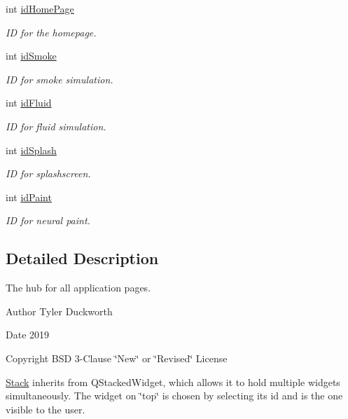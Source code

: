 \begin{DoxyCompactItemize}
int \mbox{\hyperlink{classStack_a11bccc127cb975dc118f08df920fd48d}{id\+Home\+Page}}
\begin{DoxyCompactList}\small\item\em ID for the homepage. \end{DoxyCompactList}\item 
int \mbox{\hyperlink{classStack_ad4c5c03c0dde0b63650bd258183a6ed3}{id\+Smoke}}
\begin{DoxyCompactList}\small\item\em ID for smoke simulation. \end{DoxyCompactList}\item 
int \mbox{\hyperlink{classStack_a91b33262d86feccc9a358076b69a0e90}{id\+Fluid}}
\begin{DoxyCompactList}\small\item\em ID for fluid simulation. \end{DoxyCompactList}\item 
int \mbox{\hyperlink{classStack_a448b69ac9652860c3f94f4cf2972052f}{id\+Splash}}
\begin{DoxyCompactList}\small\item\em ID for splashscreen. \end{DoxyCompactList}\item 
int \mbox{\hyperlink{classStack_af1ad238355f4a635bda88ca8b664dd29}{id\+Paint}}
\begin{DoxyCompactList}\small\item\em ID for neural paint. \end{DoxyCompactList}\end{DoxyCompactItemize}


\subsection{Detailed Description}
The hub for all application pages. 

\begin{DoxyAuthor}{Author}
Tyler Duckworth 
\end{DoxyAuthor}
\begin{DoxyDate}{Date}
2019 
\end{DoxyDate}
\begin{DoxyCopyright}{Copyright}
B\+SD 3-\/Clause \char`\"{}\+New\char`\"{} or \char`\"{}\+Revised\char`\"{} License
\end{DoxyCopyright}
\mbox{\hyperlink{classStack}{Stack}} inherits from Q\+Stacked\+Widget, which allows it to hold multiple widgets simultaneously. The widget on \char`\"{}top\char`\"{} is chosen by selecting its id and is the one visible to the user. 

